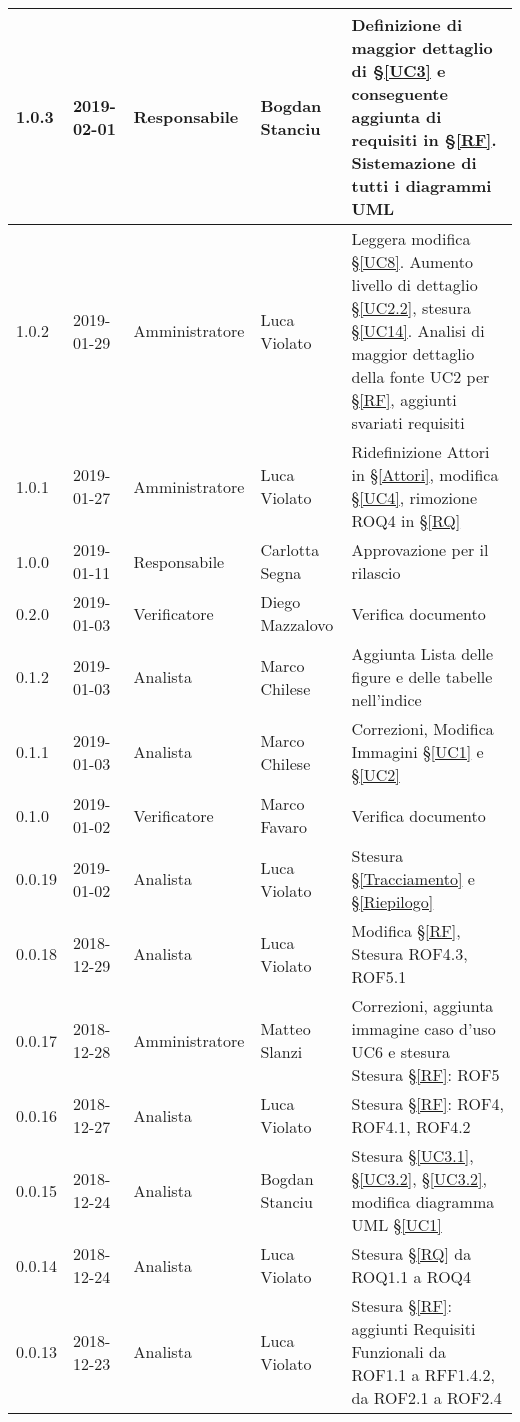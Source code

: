 \begin{center}
\begin{longtable}[C]{|m{}|m{}|m{}|m{}|p{}|}
\hline
\rowcolor{grigio}1.0.3 & 2019-02-01 & Responsabile & Bogdan Stanciu &  Definizione di maggior dettaglio di §\ref{UC3} e conseguente aggiunta di requisiti in §\ref{RF}. Sistemazione di tutti i diagrammi UML \\
\hline
1.0.2 & 2019-01-29 & Amministratore & Luca Violato & Leggera modifica §\ref{UC8}. Aumento livello di dettaglio §\ref{UC2.2}, stesura §\ref{UC14}. Analisi di maggior dettaglio della fonte UC2 per §\ref{RF}, aggiunti svariati requisiti\\
\hline
\rowcolor{grigio}1.0.1 & 2019-01-27 & Amministratore & Luca Violato & Ridefinizione Attori in §\ref{Attori}, modifica §\ref{UC4}, rimozione ROQ4 in §\ref{RQ}\\
\hline
1.0.0 & 2019-01-11 & Responsabile & Carlotta Segna & Approvazione per il rilascio \\
\hline
\rowcolor{grigio}0.2.0 & 2019-01-03 & Verificatore & Diego Mazzalovo & Verifica documento\\
\hline
0.1.2 & 2019-01-03 & Analista & Marco Chilese & Aggiunta Lista delle figure e delle tabelle nell'indice\\
\hline
\rowcolor{grigio}0.1.1 & 2019-01-03 & Analista & Marco Chilese & Correzioni, Modifica Immagini §\ref{UC1} e §\ref{UC2}\\
\hline
 0.1.0 & 2019-01-02 & Verificatore & Marco Favaro & Verifica documento\\
\hline
\rowcolor{grigio}0.0.19 & 2019-01-02 & Analista & Luca Violato & Stesura §\ref{Tracciamento} e §\ref{Riepilogo}\\
\hline
0.0.18 & 2018-12-29 & Analista & Luca Violato & Modifica §\ref{RF}, Stesura ROF4.3, ROF5.1\\
\hline
\rowcolor{grigio}0.0.17 & 2018-12-28 & Amministratore & Matteo Slanzi & Correzioni, aggiunta immagine caso d'uso UC6 e stesura Stesura §\ref{RF}: ROF5\\
\hline
0.0.16 & 2018-12-27 & Analista & Luca Violato & Stesura §\ref{RF}: ROF4, ROF4.1, ROF4.2\\
\hline
\rowcolor{grigio}0.0.15 & 2018-12-24 & Analista & Bogdan Stanciu & Stesura §\ref{UC3.1}, §\ref{UC3.2}, §\ref{UC3.2}, modifica diagramma UML §\ref{UC1} \\
\hline
0.0.14 & 2018-12-24 & Analista & Luca Violato & Stesura §\ref{RQ} da ROQ1.1 a ROQ4\\
\hline
\rowcolor{grigio}0.0.13 & 2018-12-23 & Analista & Luca Violato & Stesura §\ref{RF}: aggiunti Requisiti Funzionali da ROF1.1 a RFF1.4.2, da ROF2.1 a ROF2.4\\

\end{longtable}
\end{center}

